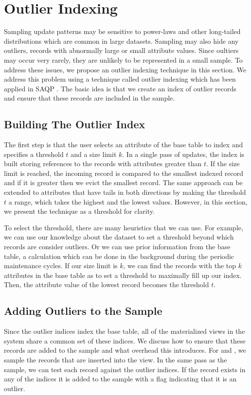 \section{Outlier Indexing}\label{outlier}
Sampling update patterns may be sensitive to power-laws and other long-tailed distributions which are common in large datasets\cite{clauset2009power}.
Sampling may also hide any outliers, records with abnormally large or small attribute values.
Since oultiers may occur very rarely, they are unlikely to be represented in a small sample. To address these issues, we propose an outlier indexing technique in this section. 
We address this problem using a technique called outlier indexing which has been applied in SAQP \cite{chaudhuri2001overcoming}.
The basic idea is that we create an index of outlier records and ensure that these records are included in the sample.

\subsection{Building The Outlier Index}
The first step is that the user selects an attribute of the base table to index and specifies a threshold $t$ and a size limit $k$.
In a single pass of updates, the index is built storing references to the records with attributes greater than $t$.
If the size limit is reached, the incoming record is compared to the smallest indexed record and if it is greater then we evict the smallest record.
The same approach can be extended to attributes that have tails in both directions by making the threshold $t$ a range, which takes the highest and the lowest values.
However, in this section, we present the technique as a threshold for clarity.

To select the threshold, there are many heuristics that we can use.
For example, we can use our knowledge about the dataset to set a threshold beyond which records are consider outliers.
Or we can use prior information from the base table, a calculation which can be done in the background during the periodic maintenance cycles.
If our size limit is $k$, we can find the records with the top $k$ attributes in the base table as to set a threshold to maximally fill up our index. 
Then, the attribute value of the lowest record becomes the threshold $t$.

\subsection{Adding Outliers to the Sample}
Since the outlier indices index the base table, all of the materialized views in the system share a common set of these indices.
We discuss how to ensure that these records are added to the sample and what overhead this introduces.
For \spview and \fjview, we sample the records that are inserted into the view.
In the same pass as the sample, we can test each record against the outlier indices. 
If the record exists in any of the indices it is added to the sample with a flag indicating that it is an outlier.

